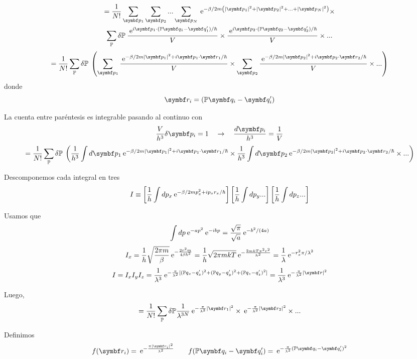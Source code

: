 \documentclass[10pt,oneside]{CBFT_book}
\begin{document}
\begin{multline*}
	= \frac{1}{N!} \sum_{\vb{p}_1} \sum_{\vb{p}_2} ... \sum_{\vb{p}_N} 
	\euler^{-\beta/2m \left( |\vb{p}_1|^2 + |\vb{p}_2|^2 + ... + |\vb{p}_N|^2 \right)} \times \\ 
	\sum_{ \mathbb{P} } \delta\mathbb{P} \: \frac{\euler^{ i \vb{p}_1 \cdot ( \mathbb{P}\vb{q}_1 - \vb{q}_1')/ 
	\hbar} }{V} \times \frac{\euler^{ i \vb{p}_2 \cdot ( \mathbb{P}\vb{q}_2 - \vb{q}_2' )/\hbar} }{V}\times ...
\end{multline*}
\[
	= \frac{1}{N!}\sum_{ \mathbb{P} } \delta\mathbb{P} \: \left( 
	\sum_{\vb{p}_1} \frac{\euler^{ -\beta/2m|\vb{p}_1|^2 + i \vb{p}_1 \cdot \vb{r}_1/ \hbar} }{V} \times 
	\sum_{\vb{p}_2} \frac{\euler^{ -\beta/2m|\vb{p}_2|^2 + i \vb{p}_2 \cdot \vb{r}_2/ \hbar} }{V} \times ...
	\right)
\]
donde 
\[
	\vb{r}_i = ( \mathbb{P}\vb{q}_i - \vb{q}_i')
\]

La cuenta entre paréntesis es integrable pasando al continuo con 
\[
	\frac{V}{h^3} \delta \vb{p}_i = 1 \quad \rightarrow \quad \frac{d\vb{p}_i}{h^3} = \frac{1}{V}
\]
\[
	= \frac{1}{N!} \sum_{ \mathbb{P} } \delta\mathbb{P} \: \left( 
	\frac{1}{h^3} \int d\vb{p}_1 \euler^{ -\beta/2m|\vb{p}_1|^2 + i \vb{p}_1 \cdot \vb{r}_1/ \hbar} \times 
	\frac{1}{h^3} \int d\vb{p}_2 \euler^{ -\beta/2m|\vb{p}_2|^2 + i \vb{p}_2 \cdot \vb{r}_2/ \hbar} \times ...
	\right)
\]

Descomponemos cada integral en tres
\[
	I \equiv \left[ \frac{1}{h} \int dp_x \:\mathrm{e}^{ -\beta/2m p_x^2 + i p_x r_x/ \hbar} \right] 
	\left[ \frac{1}{h} \int dp_y ... \right] \left[ \frac{1}{h} \int dp_z ... \right]
\]

Usamos que 
\[
	\int dp \:\mathrm{e}^{-ap^2} \:\mathrm{e}^{-ibp} = \frac{\sqrt{\pi}}{\sqrt{a}} \:\mathrm{e}^{-b^2/(4a)}
\]
\[
	I_x = \frac{1}{h} \sqrt{\frac{2\pi m}{\beta}} \:\mathrm{e}^{-\frac{2r^2m}{4\beta \hbar^2}} =
	\frac{1}{h} \sqrt{2\pi m kT} \:\mathrm{e}^{-\frac{2mkT\pi^2 r^2}{h^2}} = 
	\frac{1}{\lambda} \:\mathrm{e}^{-r_x^2\pi /\lambda^2}
\]
\[
	I = I_x I_y I_z = \frac{1}{\lambda^3} \euler^{ -\frac{\pi}{\lambda^2}
	[ (\mathbb{P}q_x-q_x')^2 + (\mathbb{P}q_y-q_y')^2 + (\mathbb{P}q_z-q_z')^2 ]} = 
	\frac{1}{\lambda^3} \euler^{ -\frac{\pi}{\lambda^2} |\vb{r}|^2 }
\]

Luego,
\[
	= \frac{1}{N!} \sum_{ \mathbb{P} } \delta\mathbb{P} \frac{1}{\lambda^{3N}}
	\euler^{ -\frac{\pi}{\lambda^2} |\vb{r}_1|^2 } \times \euler^{ -\frac{\pi}{\lambda^2} |\vb{r}_2|^2 } \times ...
\]

Definimos
\[
	f( \vb{r}_i ) = \euler^{ -\frac{ \pi |\vb{r}_i|^2 }{ \lambda^2 } } \qquad 
	f( \mathbb{P}\vb{q}_i - \vb{q}_i' ) = \euler^{ -\frac{ \pi }{ \lambda^2 }(\mathbb{P}\vb{q}_i - \vb{q}_i')^2 }
\]
\end{document}
